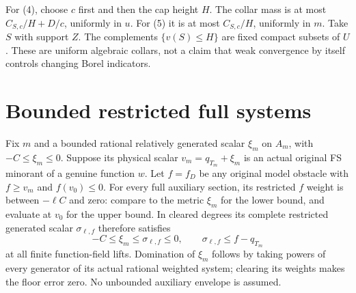 \documentclass[11pt]{article}
\begin{document}
For (4), choose $c$ first and then the cap height $H$.
The collar mass is at most $C_{S,c}/H+D/c$, uniformly in $u$.
For (5) it is at most $C_{S,c}/H$, uniformly in $m$.
Take $S$ with support $Z$.
The complements $\{v(S)\leq H\}$ are fixed compact subsets of $U$.
These are uniform algebraic collars, not a claim that weak
convergence by itself controls changing Borel indicators.

\section{Bounded restricted full systems}
Fix $m$ and a bounded rational relatively generated scalar $\xi_m$
on $A_m$, with $-C\leq\xi_m\leq0$.
Suppose its physical scalar $v_m=q_{T_m}+\xi_m$ is an actual
original FS minorant of a genuine function $w$.
Let $f=f_D$ be any original model obstacle with $f\geq v_m$
and $f(v_0)\leq0$.
For every full auxiliary section, its restricted $f$ weight is
between $-\ell C$ and zero: compare to the metric $\xi_m$ for
the lower bound, and evaluate at $v_0$ for the upper bound.
In cleared degrees its complete restricted generated scalar
$\sigma_{\ell,f}$ therefore satisfies
\[
 -C\leq\xi_m\leq\sigma_{\ell,f}\leq0,\qquad
 \sigma_{\ell,f}\leq f-q_{T_m}
\]
at all finite function-field lifts.
Domination of $\xi_m$ follows by taking powers of every generator
of its actual rational weighted system; clearing its weights makes
the floor error zero. No unbounded auxiliary envelope is assumed.
\end{document}
